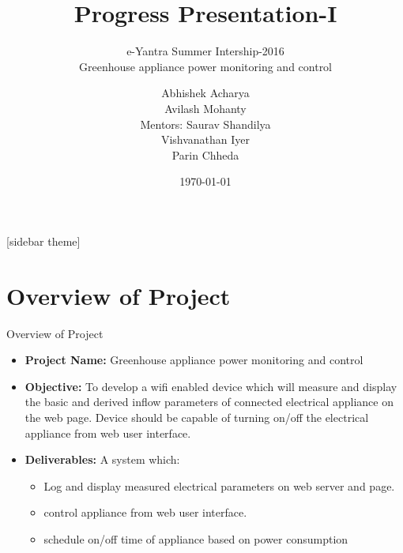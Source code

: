 \documentclass[10pt, a4paper]{beamer}
\begin{document}
	\title{Progress Presentation-I}
	\subtitle{e-Yantra Summer Intership-2016 \\ Greenhouse appliance power monitoring and control}
	\author{Abhishek Acharya\\Avilash Mohanty\\
	Mentors: Saurav Shandilya\\ \hspace{1.4cm} Vishvanathan Iyer\\\hspace{1.0cm}Parin Chheda}
	\date{\today}
	\frame{\titlepage}

[sidebar theme]
\section{Overview of Project}
\begin{frame}{Overview of Project}
	\begin{itemize}
		\item \textbf{Project Name:} Greenhouse appliance power monitoring and control
		\item \textbf{Objective:} To develop a wifi enabled device which will measure and display the basic and derived inflow parameters of connected electrical appliance on the web page. Device should be capable of turning on/off the electrical appliance from web user interface.  
		\item \textbf{Deliverables:} A system which:\\
		\begin{itemize}
			\item Log and display measured electrical parameters on web server and page.
			\item control appliance from web user interface.
			\item schedule on/off time of appliance based on power consumption	
		\end{itemize}
	\end{itemize}
\end{frame}
\end{document}
